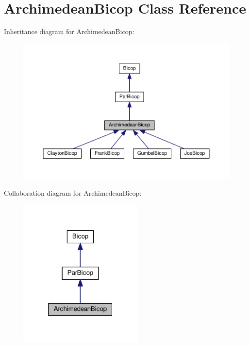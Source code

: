 \hypertarget{class_archimedean_bicop}{\section{Archimedean\+Bicop Class Reference}
\label{class_archimedean_bicop}
}


Inheritance diagram for Archimedean\+Bicop\+:\nopagebreak
\begin{figure}[H]
\begin{center}
\leavevmode
\includegraphics[width=350pt]{class_archimedean_bicop__inherit__graph}
\end{center}
\end{figure}


Collaboration diagram for Archimedean\+Bicop\+:\nopagebreak
\begin{figure}[H]
\begin{center}
\leavevmode
\includegraphics[width=176pt]{class_archimedean_bicop__coll__graph}
\end{center}
\end{figure}

